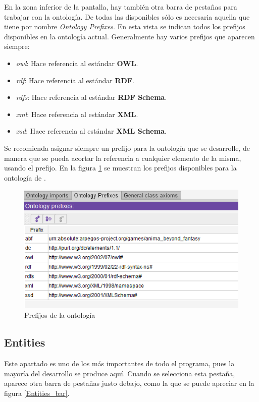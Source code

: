 En la zona inferior de la pantalla, hay también otra barra de pestañas para trabajar con la ontología. 
De todas las disponibles sólo es necesaria aquella que tiene por nombre \textit{Ontology Prefixes}.
En esta vista se indican todos los prefijos disponibles en la ontología actual. Generalmente hay 
varios prefijos que aparecen siempre:

\begin{itemize}
    \item \textit{owl}: Hace referencia al estándar \textbf{OWL}.
    \item \textit{rdf}: Hace referencia al estándar \textbf{RDF}.
    \item \textit{rdfs}: Hace referencia al estándar \textbf{RDF Schema}.
    \item \textit{xml}: Hace referencia al estándar \textbf{XML}.
    \item \textit{xsd}: Hace referencia al estándar \textbf{XML Schema}.
\end{itemize}

Se recomienda asignar siempre un prefijo para la ontología que se desarrolle, de manera que se pueda acortar 
la referencia a cualquier elemento de la misma, usando el prefijo. En la figura \ref*{Ontology_prefixes} se 
muestran los prefijos disponibles para la ontología de \anima.\medskip

\begin{figure}[ht]
    \centering
    \includegraphics[scale=0.6]{Figures/Protege/Ontology_prefixes.png}
    \caption{Prefijos de la ontología}
    \label{Ontology_prefixes}
\end{figure}

\subsection{Entities}
Este apartado es uno de los más importantes de todo el programa, pues la mayoría del desarrollo se produce aquí.
Cuando se selecciona esta pestaña, aparece otra barra de pestañas justo debajo, como la que se puede apreciar 
en la figura \ref*{Entities_bar}. \medskip

